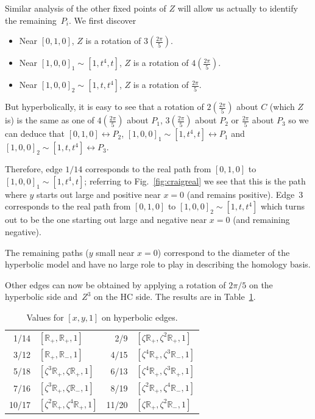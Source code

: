 \documentclass[pdftex]{sigma}
\numberwithin{equation}{section}
\begin{document}
Similar analysis of the other f\/ixed points of $Z$ will allow us
actually  to identify the remai\-ning~$P_i$. We f\/irst discover
\begin{itemize}\itemsep=0pt
\item Near $[0,1,0]$, $Z$ is a rotation of
  $3\left(\frac{2\pi}{5}\right)$.
\item Near $[1,0,0]_1 \sim [1,t^4,t]$, $Z$ is a rotation of
  $4\left(\frac{2\pi}{5}\right)$.
\item Near $[1,0,0]_2 \sim [1,t,t^4]$, $Z$ is a rotation of
  $\frac{2\pi}{5}$.
\end{itemize}
But hyperbolically, it is easy to see that a rotation of
$2\left(\frac{2\pi}{5}\right)$ about $C$ (which $Z$ is) is the same as
one of $4\left(\frac{2\pi}{5}\right)$ about $P_1$,
$3\left(\frac{2\pi}{5}\right)$ about $P_2$ or $\frac{2\pi}{5}$ about
$P_3$ so we can deduce that $[0,1,0] \leftrightarrow P_2$, $[1,0,0]_1
\sim [1,t^4,t] \leftrightarrow P_1$ and $[1,0,0]_2 \sim [1,t,t^4]
\leftrightarrow P_3$.

Therefore, edge $1/14$ corresponds to the real path from $[0,1,0]$ to
$[1,0,0]_1 \sim [1,t^4,t]$; referring to Fig.~\ref{fig:craigreal} we
see that this is the path where $y$ starts out large and positive near
$x=0$ (and remains positive). Edge~3 corresponds to the real path from
$[0,1,0]$ to $[1,0,0]_2\sim [1,t,t^4]$ which turns out to be the one
starting out large and negative near $x=0$ (and remaining negative).

The remaining paths ($y$ small near $x=0$) correspond to the diameter
of the hyperbolic model and have no large role to play in describing
the homology basis.

Other edges can now be obtained by applying a rotation of $2\pi/5$ on
the hyperbolic side and~$Z^3$ on the HC side. The results are in
Table~\ref{tab:hypcraigedges}.
\begin{table}[t]
\caption{Values for $[x,y,1]$ on hyperbolic edges.}
  \label{tab:hypcraigedges}
  \centering
  \begin{tabular}{rl|rl}
    1/14 & $[\mathbb{R}_+,\mathbb{R}_+,1]$ &
    2/9 & $[\zeta\mathbb{R}_+,\zeta^2\mathbb{R}_+,1]$ \\
    3/12 & $[\mathbb{R}_+,\mathbb{R}_-,1]$ &
    4/15 & $[\zeta^4\mathbb{R}_+,\zeta^3\mathbb{R}_-,1]$ \\
    5/18 & $[\zeta^3\mathbb{R}_+,\zeta\mathbb{R}_+,1]$ &
    6/13 & $[\zeta^4\mathbb{R}_+,\zeta^3\mathbb{R}_+,1]$ \\
    7/16 & $[\zeta^3\mathbb{R}_+,\zeta\mathbb{R}_-,1]$ &
    8/19 & $[\zeta^2\mathbb{R}_+,\zeta^4\mathbb{R}_-,1]$ \\
    10/17 & $[\zeta^2\mathbb{R}_+,\zeta^4\mathbb{R}_+,1]$ &
    11/20 & $[\zeta\mathbb{R}_+,\zeta^2\mathbb{R}_-,1]$
  \end{tabular}
\end{table}
\end{document}

